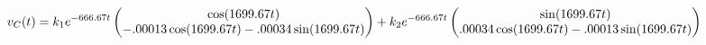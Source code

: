 \documentclass[preview]{standalone}
\begin{document}
\begin{center}
\[
                                                        v_C(t) = k_1e^{-666.67t}
                                                        \begin{pmatrix} 
                                                        \cos(1699.67t) \\ 
                                                        -.00013\cos(1699.67t) - .00034\sin(1699.67t)
                                                        \end{pmatrix}
                                                        + \\
                                                        k_2e^{-666.67t}
                                                        \begin{pmatrix} 
                                                        \sin(1699.67t) \\ 
                                                        .00034\cos(1699.67t) - .00013\sin(1699.67t)
                                                        \end{pmatrix}
                                                \]
\end{center}
\end{document}
